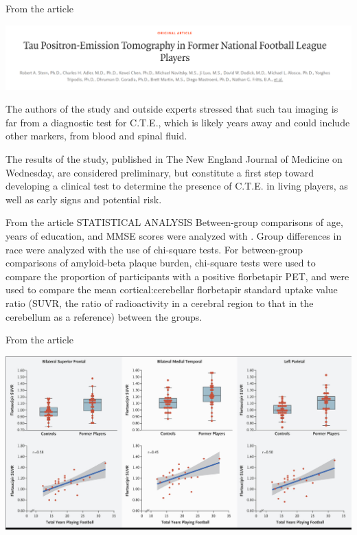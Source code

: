 \documentclass[
  ignorenonframetext,
  aspectratio=169]{beamer}
\renewcommand{\textbf}{\structure}
\begin{document}
\begin{frame}{From the article}
\protect\hypertarget{from-the-article}{}
\begin{center}\includegraphics[width=0.7\linewidth]{./images/concussion_nejm} \end{center}

The authors of the study and outside experts stressed that such tau
imaging is far from a diagnostic test for C.T.E., which is likely years
away and could include other markers, from blood and spinal fluid.

The results of the study, published in The New England Journal of
Medicine on Wednesday, are considered preliminary, but constitute a
first step toward developing a clinical test to determine the presence
of C.T.E. in living players, as well as early signs and potential risk.
\end{frame}

\begin{frame}{From the article}
\protect\hypertarget{from-the-article-1}{}
STATISTICAL ANALYSIS Between-group comparisons of age, years of
education, and MMSE scores were analyzed with \textbf{Mann--Whitney U
tests}. Group differences in race were analyzed with the use of
chi-square tests. For between-group comparisons of amyloid-beta plaque
burden, chi-square tests were used to compare the proportion of
participants with a positive florbetapir PET, and \textbf{t-tests} were
used to compare the mean cortical:cerebellar florbetapir standard uptake
value ratio (SUVR, the ratio of radioactivity in a cerebral region to
that in the cerebellum as a reference) between the groups.
\end{frame}

\begin{frame}{From the article}
\protect\hypertarget{from-the-article-2}{}
\begin{center}\includegraphics[width=0.7\linewidth]{./images/concussion_graphs} \end{center}
\end{frame}
\end{document}
